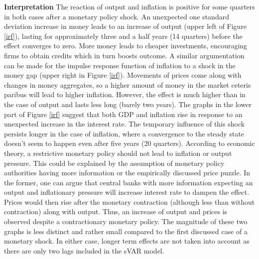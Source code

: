 \documentclass[11pt,a4paper]{report}
\begin{document}
\noindent \textbf{Interpretation}
\newline
The reaction of output and inflation is positive for some quarters in both cases after a monetary policy shock. An unexpected one standard deviation increase in money leads to an increase of output (upper left of Figure \ref{irf}), lasting for approximately three and a half years (14 quarters) before the effect converges to zero. More money leads to cheaper investments, encouraging firms to obtain credits which in turn boosts outcome. A similar argumentation can be made for the impulse response function of inflation to a shock in the money gap (upper right in Figure \ref{irf}).  Movements of prices come along with changes in money aggregates, so a higher amount of money in the market ceteris paribus will lead to higher inflation. However, the effect is much higher than in the case of output and lasts less long (barely two years). The graphs in the lower part of Figure \ref{irf} suggest that both GDP and inflation rise in response to an unexpected increase in the interest rate. The temporary influence of this shock persists longer in the case of inflation, where a convergence to the steady state doesn't seem to happen even after five years (20 quarters). According to economic theory,  a  restrictive  monetary  policy  should  not  lead  to  inflation  or  output  pressure. This could be explained by the assumption of monetary policy authorities having more information or the empirically discussed price puzzle. In the former, one can argue that central banks with more information expecting an output and inflationary pressure will increase interest rate to dampen the effect. Prices would then rise after the monetary contraction (although less than without contraction) along with output. Thus, an increase of output and prices is observed despite a contractionary monetary policy. The magnitude of these two graphs is less distinct and rather small compared to the first discussed case of a monetary shock. In either case, longer term effects are not taken into account as there are only two lags included in the sVAR model.
\end{document}
